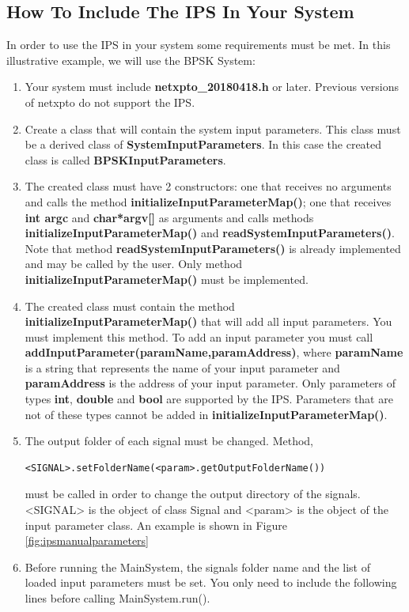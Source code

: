 \subsection{How To Include The IPS In Your System}
In order to use the IPS in your system some requirements must be met. In this illustrative example, we will use the BPSK System:
\begin{enumerate}
\item Your system must include \textbf{netxpto\_20180418.h} or later. Previous versions of netxpto do not support the IPS.
\item Create a class that will contain the system input parameters. This class must be a derived class of \textbf{SystemInputParameters}. In this case the created class is called \textbf{BPSKInputParameters}.
\item The created class must have 2 constructors: one that receives no arguments and calls the method \textbf{initializeInputParameterMap()}; one that receives \textbf{int argc} and \textbf{char*argv[]} as arguments and calls methods \textbf{initializeInputParameterMap()} and \textbf{readSystemInputParameters()}. Note that method \textbf{readSystemInputParameters()} is already implemented and may be called by the user. Only method \textbf{initializeInputParameterMap()} must be implemented.
\item The created class must contain the method \textbf{initializeInputParameterMap()} that will add all input parameters.
You must implement this method. To add an input parameter you must call \textbf{addInputParameter(paramName,paramAddress)}, where \textbf{paramName} is a string that represents the name of your input parameter and \textbf{paramAddress} is the address of your input parameter. Only parameters of types \textbf{int}, \textbf{double} and \textbf{bool} are supported by the IPS. Parameters that are not of these types cannot be added in \textbf{initializeInputParameterMap()}.
\item The output folder of each signal must be changed. Method,
\begin{lstlisting}
<SIGNAL>.setFolderName(<param>.getOutputFolderName())
\end{lstlisting}
 must be called in order to change the output directory of the signals. <SIGNAL> is the object of class Signal and <param> is the object of the input parameter class. An example is shown in Figure \ref{fig:ipsmanualparameters}
\item Before running the MainSystem, the signals folder name and the list of loaded input parameters must be set. You only need to include the following lines before calling MainSystem.run().
\end{enumerate}
\pagebreak


